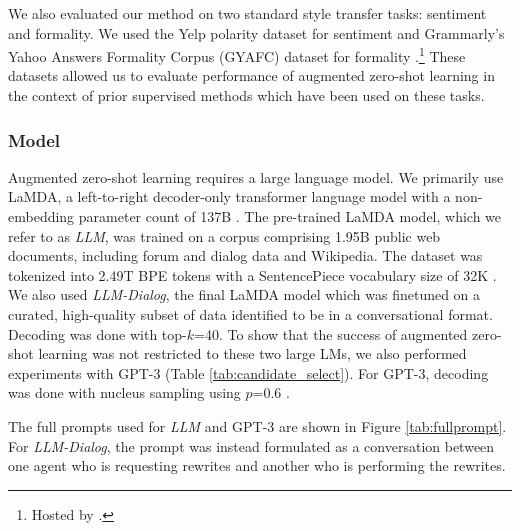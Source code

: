 We also evaluated our method on two standard style transfer tasks: sentiment and formality.
We used the Yelp polarity dataset \citep{zhangCharacterlevelConvolutionalNetworks2015} for sentiment and Grammarly's Yahoo Answers Formality Corpus (GYAFC) dataset for formality \citep{rao-tetreault-2018-dear}.\footnote{Hosted by \citet{DBLP:conf/ijcai/LuoLZYCSS19}.}
These datasets allowed us to evaluate performance of augmented zero-shot learning in the context of prior supervised methods which have been used on these tasks.

\subsubsection{Model}
\label{subsection:lambda_description}
Augmented zero-shot learning requires a large language model.
We primarily use LaMDA, a left-to-right decoder-only transformer language model \citep{DBLP:journals/corr/VaswaniSPUJGKP17} with a non-embedding parameter count of 137B \citep{thoppilan2022lamda}. 
The pre-trained LaMDA model, which we refer to as \textit{LLM}, was trained on a corpus comprising 1.95B public web documents, including forum and dialog data and Wikipedia.
The dataset was tokenized into 2.49T BPE tokens with a SentencePiece vocabulary size of 32K \citep{DBLP:journals/corr/abs-1808-06226}.
We also used \textit{LLM-Dialog}, the final LaMDA model which was finetuned on a curated, high-quality subset of data identified to be in a conversational format.
Decoding was done with top-$k$=40.
To show that the success of augmented zero-shot learning was not restricted to these two large LMs, we also performed experiments with GPT-3 (Table \ref{tab:candidate_select}).
For GPT-3, decoding was done with nucleus sampling using $p$=0.6 \citep{holtzman2019curious}.

The full prompts used for \textit{LLM} and GPT-3 are shown in Figure \ref{tab:fullprompt}.
For \textit{LLM-Dialog}, the prompt was instead formulated as a conversation between one agent who is requesting rewrites and another who is performing the rewrites.


